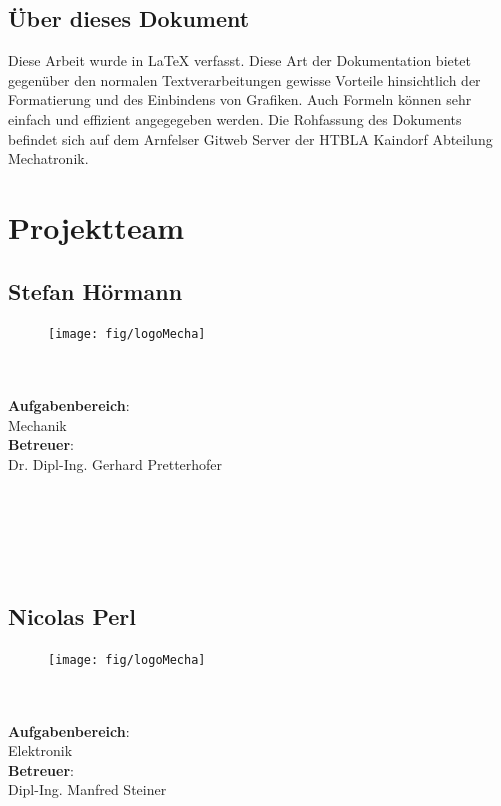 \subsection*{Über dieses Dokument}
\label{sec:ueber-dokument}
Diese Arbeit wurde in \LaTeX{} verfasst. Diese Art der Dokumentation bietet gegenüber den normalen Textverarbeitungen gewisse Vorteile hinsichtlich der Formatierung und des Einbindens von Grafiken. Auch Formeln können sehr einfach und effizient angegegeben werden. Die Rohfassung des Dokuments befindet sich auf dem Arnfelser Gitweb Server der HTBLA Kaindorf Abteilung Mechatronik.

\clearpage

\newpage
\thispagestyle{empty}
\mbox{}

\clearpage

\section*{Projektteam}
\label{sec:projektteam}

\subsection*{Stefan Hörmann}
\begin{figure}
\begin{center}
  \texttt{[image: fig/logoMecha]}
\end{center}
\end{figure}
\mbox{}\\
\mbox{}\\
\textbf{Aufgabenbereich}:\\
Mechanik\\
\textbf{Betreuer}:\\
Dr. Dipl-Ing. Gerhard Pretterhofer
\mbox{}\\
\mbox{}\\
\mbox{}\\
\mbox{}\\
\mbox{}\\
\mbox{}\\

\subsection*{Nicolas Perl}
\begin{figure}
\begin{center}
  \texttt{[image: fig/logoMecha]}
\end{center}
\end{figure}
\mbox{}\\
\mbox{}\\
\textbf{Aufgabenbereich}:\\
Elektronik\\
\textbf{Betreuer}:\\
Dipl-Ing. Manfred Steiner
\mbox{}\\
\mbox{}\\
\mbox{}\\
\mbox{}\\
\mbox{}\\


